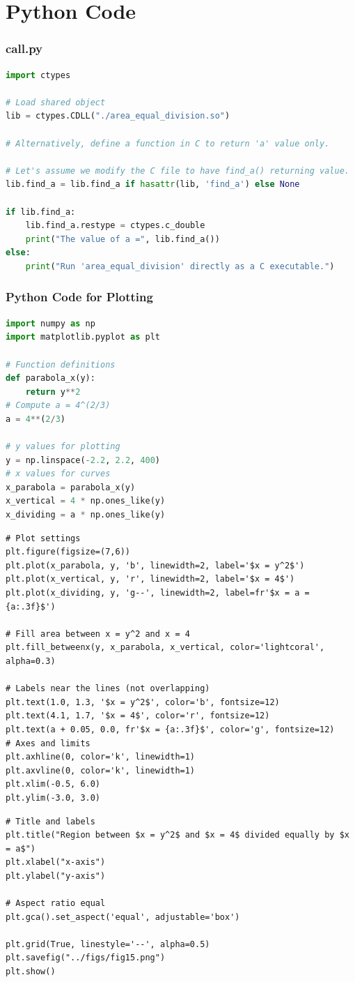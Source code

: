\documentclass{beamer}
\theoremstyle{remark}
\numberwithin{equation}{section}
\begin{document}
\section{Python Code}
\begin{frame}[fragile]
\frametitle{call.py}
\begin{lstlisting}[language=Python]
import ctypes

# Load shared object
lib = ctypes.CDLL("./area_equal_division.so")

# Alternatively, define a function in C to return 'a' value only.

# Let's assume we modify the C file to have find_a() returning value.
lib.find_a = lib.find_a if hasattr(lib, 'find_a') else None

if lib.find_a:
    lib.find_a.restype = ctypes.c_double
    print("The value of a =", lib.find_a())
else:
    print("Run 'area_equal_division' directly as a C executable.")
\end{lstlisting}
\end{frame}
\begin{frame}[fragile]
\frametitle{Python Code for Plotting}
\begin{lstlisting}[language=Python]
import numpy as np
import matplotlib.pyplot as plt

# Function definitions
def parabola_x(y):
    return y**2
# Compute a = 4^(2/3)
a = 4**(2/3)

# y values for plotting
y = np.linspace(-2.2, 2.2, 400)
# x values for curves
x_parabola = parabola_x(y)
x_vertical = 4 * np.ones_like(y)
x_dividing = a * np.ones_like(y)
\end{lstlisting}
\end{frame}
\begin{frame}[fragile]
\begin{lstlisting}
# Plot settings
plt.figure(figsize=(7,6))
plt.plot(x_parabola, y, 'b', linewidth=2, label='$x = y^2$')
plt.plot(x_vertical, y, 'r', linewidth=2, label='$x = 4$')
plt.plot(x_dividing, y, 'g--', linewidth=2, label=fr'$x = a = {a:.3f}$')

# Fill area between x = y^2 and x = 4
plt.fill_betweenx(y, x_parabola, x_vertical, color='lightcoral', alpha=0.3)

# Labels near the lines (not overlapping)
plt.text(1.0, 1.3, '$x = y^2$', color='b', fontsize=12)
plt.text(4.1, 1.7, '$x = 4$', color='r', fontsize=12)
plt.text(a + 0.05, 0.0, fr'$x = {a:.3f}$', color='g', fontsize=12)
# Axes and limits
plt.axhline(0, color='k', linewidth=1)
plt.axvline(0, color='k', linewidth=1)
plt.xlim(-0.5, 6.0)
plt.ylim(-3.0, 3.0)
\end{lstlisting}
\end{frame}
\begin{frame}[fragile]
\begin{lstlisting}
# Title and labels
plt.title("Region between $x = y^2$ and $x = 4$ divided equally by $x = a$")
plt.xlabel("x-axis")
plt.ylabel("y-axis")

# Aspect ratio equal
plt.gca().set_aspect('equal', adjustable='box')

plt.grid(True, linestyle='--', alpha=0.5)
plt.savefig("../figs/fig15.png")
plt.show()
\end{lstlisting}
\end{frame}
\end{document}
